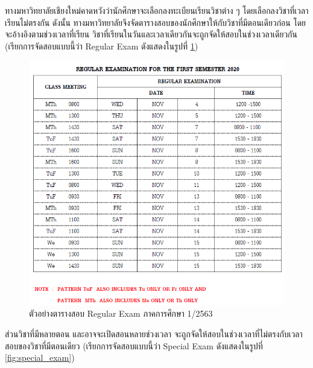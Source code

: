 ทางมหาวิทยาลัยเชียงใหม่คาดหวังว่านักศึกษาจะเลือกลงทะเบียนเรียนวิชาต่าง ๆ โดยเลือกลงวิชาที่เวลาเรียนไม่ตรงกัน 
ดังนั้น ทางมหาวิทยาลัยจึงจัดตารางสอบของนักศึกษาให้กับวิชาที่มีตอนเดียวก่อน โดยจะอ้างอิงตามช่วงเวลาที่เรียน 
วิชาที่เรียนในวันและเวลาเดียวกันจะถูกจัดให้สอบในช่วงเวลาเดียวกัน (เรียกการจัดสอบแบบนี้ว่า Regular Exam ดังแสดงในรูปที่ \ref{fig:regular_exam}) 
%
\begin{figure}
    \centering
    \includegraphics[width=\linewidth]{images/regular_exam.png}
    \caption[ตัวอย่างตารางสอบ Regular Exam ภาคการศึกษา 1/2563]{ตัวอย่างตารางสอบ Regular Exam ภาคการศึกษา 1/2563 \cite{reg-timetable}}
    \label{fig:regular_exam}
\end{figure}
%
ส่วนวิชาที่มีหลายตอน และอาจจะเปิดสอนหลายช่วงเวลา จะถูกจัดให้สอบในช่วงเวลาที่ไม่ตรงกับเวลาสอบของวิชาที่มีตอนเดียว  (เรียกการจัดสอบแบบนี้ว่า Special Exam ดังแสดงในรูปที่ \ref{fig:special_exam}) 
%
